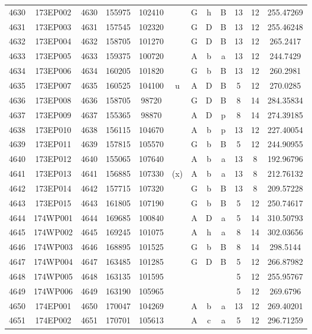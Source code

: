 \begin{tabular}{|*{12}{c|}}
4630 & 173EP002 & 4630 & 155975 & 102410 &  & G & h & B & 13 & 12 & 255.47269 \\ 
4631 & 173EP003 & 4631 & 157545 & 102320 &  & G & D & B & 13 & 12 & 255.46248 \\ 
4632 & 173EP004 & 4632 & 158705 & 101270 &  & G & D & B & 13 & 12 & 265.2417 \\ 
4633 & 173EP005 & 4633 & 159375 & 100720 &  & A & b & a & 13 & 12 & 244.7429 \\ 
4634 & 173EP006 & 4634 & 160205 & 101820 &  & G & b & B & 13 & 12 & 260.2981 \\ 
4635 & 173EP007 & 4635 & 160525 & 104100 & u & A & D & B & 5 & 12 & 270.0285 \\ 
4636 & 173EP008 & 4636 & 158705 & 98720 &  & G & D & B & 8 & 14 & 284.35834 \\ 
4637 & 173EP009 & 4637 & 155365 & 98870 &  & A & D & p & 8 & 14 & 274.39185 \\ 
4638 & 173EP010 & 4638 & 156115 & 104670 &  & A & b & p & 13 & 12 & 227.40054 \\ 
4639 & 173EP011 & 4639 & 157815 & 105570 &  & G & b & B & 5 & 12 & 244.90955 \\ 
4640 & 173EP012 & 4640 & 155065 & 107640 &  & A & b & a & 13 & 8 & 192.96796 \\ 
4641 & 173EP013 & 4641 & 156885 & 107330 & (x) & A & b & a & 13 & 8 & 212.76132 \\ 
4642 & 173EP014 & 4642 & 157715 & 107320 &  & G & b & B & 13 & 8 & 209.57228 \\ 
4643 & 173EP015 & 4643 & 161805 & 107190 &  & G & b & B & 5 & 12 & 250.74617 \\ 
4644 & 174WP001 & 4644 & 169685 & 100840 &  & A & D & a & 5 & 14 & 310.50793 \\ 
4645 & 174WP002 & 4645 & 169245 & 101075 &  & A & h & a & 8 & 14 & 302.03656 \\ 
4646 & 174WP003 & 4646 & 168895 & 101525 &  & G & b & B & 8 & 14 & 298.5144 \\ 
4647 & 174WP004 & 4647 & 163485 & 101285 &  & G & D & B & 5 & 12 & 266.87982 \\ 
4648 & 174WP005 & 4648 & 163135 & 101595 &  &  &  &  & 5 & 12 & 255.95767 \\ 
4649 & 174WP006 & 4649 & 163190 & 105965 &  &  &  &  & 5 & 12 & 269.6796 \\ 
4650 & 174EP001 & 4650 & 170047 & 104269 &  & A & b & a & 13 & 12 & 269.40201 \\ 
4651 & 174EP002 & 4651 & 170701 & 105613 &  & A & c & a & 5 & 12 & 296.71259 \\ 

\end{tabular}
